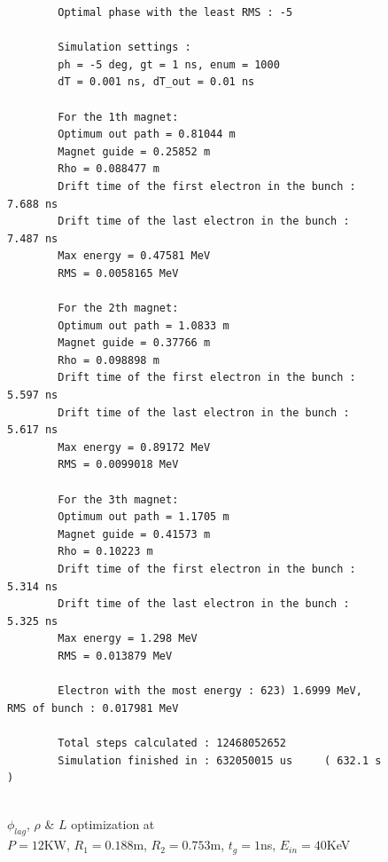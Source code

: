 \documentclass[a4paper,oneside,12pt]{report}
\numberwithin{equation}{chapter}
\begin{document}
\begin{figure}[H]
    \centering
    \captionsetup{justification=centering}
    \begin{verbatim}
        Optimal phase with the least RMS : -5

        Simulation settings : 
        ph = -5 deg, gt = 1 ns, enum = 1000
        dT = 0.001 ns, dT_out = 0.01 ns
        
        For the 1th magnet:
        Optimum out path = 0.81044 m
        Magnet guide = 0.25852 m
        Rho = 0.088477 m
        Drift time of the first electron in the bunch : 7.688 ns
        Drift time of the last electron in the bunch : 7.487 ns
        Max energy = 0.47581 MeV
        RMS = 0.0058165 MeV
        
        For the 2th magnet:
        Optimum out path = 1.0833 m
        Magnet guide = 0.37766 m
        Rho = 0.098898 m
        Drift time of the first electron in the bunch : 5.597 ns
        Drift time of the last electron in the bunch : 5.617 ns
        Max energy = 0.89172 MeV
        RMS = 0.0099018 MeV
        
        For the 3th magnet:
        Optimum out path = 1.1705 m
        Magnet guide = 0.41573 m
        Rho = 0.10223 m
        Drift time of the first electron in the bunch : 5.314 ns
        Drift time of the last electron in the bunch : 5.325 ns
        Max energy = 1.298 MeV
        RMS = 0.013879 MeV

        Electron with the most energy : 623) 1.6999 MeV,	RMS of bunch : 0.017981 MeV
        
        Total steps calculated : 12468052652
        Simulation finished in : 632050015 us     ( 632.1 s )
        
    \end{verbatim}
\caption{$\phi_{lag}$, $\rho$ \& $L$ optimization at \\$P=12$KW, $R_1=0.188$m, $R_2=0.753$m, $t_g=1$ns, $E_{in}=40$KeV}
\label{fig:lout_opt_1ns_Erms}
\end{figure}
\end{document}
